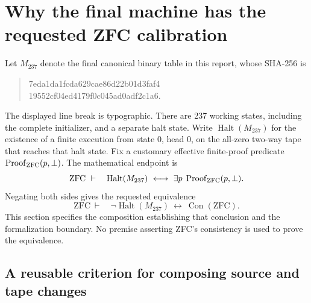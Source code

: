 \section{Why the final machine has the requested ZFC calibration}
\label{sec:logic-review-endpoint}

Let $M_{237}$ denote the final canonical binary table in this report,
whose SHA-256 is
\begin{quote}\small\ttfamily
7eda1da1fcda629cae86d22b01d3faf4\\
19552cf04ed4179f0c045ad0adf2c1a6.
\end{quote}
The displayed line break is typographic.  There are 237 working states,
including the complete initializer, and a separate halt state.  Write
$\operatorname{Halt}(M_{237})$ for the existence of a finite execution from
state 0, head 0, on the all-zero two-way tape that reaches that halt state.
Fix a customary effective finite-proof predicate
$\operatorname{Proof}_{\rm ZFC}(p,\bot)$.  The mathematical endpoint is
\begin{equation}
 \mathrm{ZFC}\ \vdash\quad
 \operatorname{Halt}(M_{237})
 \ \longleftrightarrow\
 \exists p\;\operatorname{Proof}_{\rm ZFC}(p,\bot).
 \label{eq:review-halting}
\end{equation}
Negating both sides gives the requested equivalence
\[
 \mathrm{ZFC}\ \vdash\quad
 \neg\operatorname{Halt}(M_{237})
 \ \longleftrightarrow\
 \operatorname{Con}(\mathrm{ZFC}).
\]
This section specifies the composition establishing that conclusion and
the formalization boundary.  No premise asserting ZFC's consistency is
used to prove the equivalence.

\subsection{A reusable criterion for composing source and tape changes}

